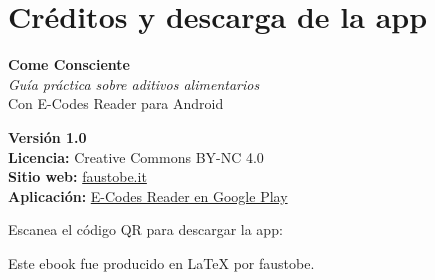 \documentclass[a5paper,12pt,oneside,openany]{book}
\begin{document}
\backmatter

\chapter*{Créditos y descarga de la app}

\begin{center}
\vspace{1cm}
{\large\bfseries\color{verdescuro} Come Consciente}\\[0.4cm]
{\itshape Guía práctica sobre aditivos alimentarios}\\[0.3cm]
{\small Con E-Codes Reader para Android}

\vspace{1.5cm}
\textbf{Versión 1.0} \quad \textbullet {}\\
\textbf{Licencia:} Creative Commons BY-NC 4.0\\[0.3cm]
\textbf{Sitio web:} \href{https://faustobe.it}{faustobe.it}\\
\textbf{Aplicación:} \href{https://play.google.com/store/apps/details?id=it.faustobe.ecodes}{E-Codes Reader en Google Play}

\vspace{1.5cm}
{\small Escanea el código QR para descargar la app:}\\[0.5cm]


\vspace{1cm}
{\footnotesize Este ebook fue producido en \LaTeX{} por faustobe.}
\end{center}
\end{document}
